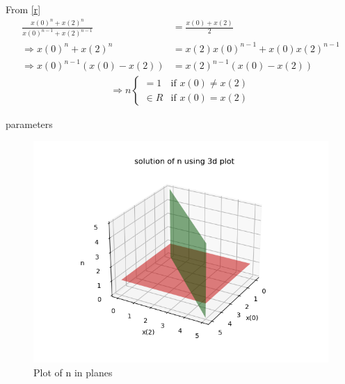 \documentclass[journal,12pt,twocolumn]{IEEEtran}
\theoremstyle{remark}
\begin{document}
From \eqref{r}
\begin{align}
    \frac{x(0)^n +x(2)^n}{x(0)^{n-1} + x(2)^{n-1}}&= \frac{x(0)+x(2)}{2}  \\
    \Rightarrow x(0)^n+x(2)^n&=x(2)x(0)^{n-1}+x(0)x(2)^{n-1} \\
    \Rightarrow x(0)^{n-1}(x(0)-x(2))&=x(2)^{n-1}(x(0)-x(2))\label{2}
 \end{align}
\begin{align}
	\Rightarrow n
	\begin{cases}
		=1  &\text{if } x(0)\neq x(2)\\
		\in R &\text{if } x(0)=x(2)
	\end{cases}
\end{align}
\begin{table}[h!]
	
	\caption{parameters}
\end{table}
\begin{figure}[h]
\centering
\includegraphics[width=2\columnwidth]{finalplot.png}
\caption{Plot of n in planes}
\label{solution}
\end{figure}

 
\end{document}
